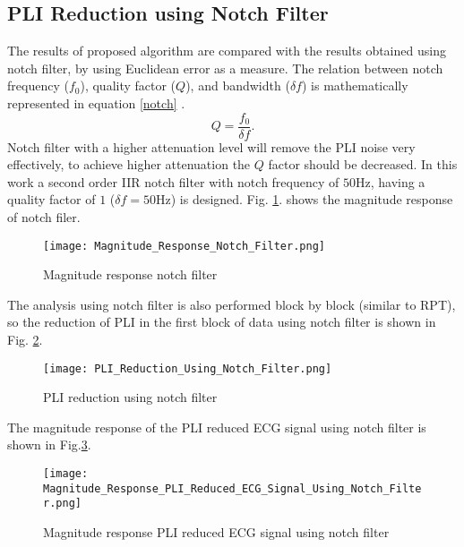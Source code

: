 \documentclass[conference]{IEEEtran}
\begin{document}

\subsection{PLI Reduction using Notch Filter}
The results of proposed algorithm are compared with the results obtained using notch filter, by using Euclidean error as a measure. The relation between notch frequency ($f_0$), quality factor ($Q$), and bandwidth ($\delta{f}$) is mathematically represented in equation \eqref{notch} \cite{6530021}.
\begin{equation}
\label{notch}
Q = \frac{f_0}{\delta{f}}.
\end{equation}
Notch filter with a higher attenuation level will remove the PLI noise very effectively, to achieve higher attenuation the $Q$ factor should be decreased. In this work a second order IIR notch filter with notch frequency of $50$Hz, having a quality factor of $1$ ($\delta{f} = 50$Hz) is designed. Fig. \ref{Magnitude Response Notch Filter}. shows the magnitude response of notch filer.
\begin{figure}[!h]
\centering
 \texttt{[image: Magnitude\_Response\_Notch\_Filter.png]} 
\caption[Magnitude Response Notch Filter]{Magnitude response notch filter}
\label{Magnitude Response Notch Filter}
\end{figure}

The analysis using notch filter is also performed block by block (similar to RPT), so the reduction of PLI in the first block of data using notch filter is shown in Fig. \ref{PLI Reduction Using Notch Filter}.
\begin{figure}[!h]
\centering
 \texttt{[image: PLI\_Reduction\_Using\_Notch\_Filter.png]} 
\caption[PLI Reduction Using Notch Filter]{PLI reduction using notch filter}
\label{PLI Reduction Using Notch Filter}
\end{figure}
The magnitude response of the PLI reduced ECG signal using notch filter is shown in Fig.\ref{Magnitude Response PLI Reduced ECG Signal Using Notch Filter}.
\begin{figure}[!h]
\centering
 \texttt{[image: Magnitude\_Response\_PLI\_Reduced\_ECG\_Signal\_Using\_Notch\_Filter.png]} 
\caption[Magnitude Response PLI Reduced ECG Signal Using Notch Filter]{Magnitude response PLI reduced ECG signal using notch filter}
\label{Magnitude Response PLI Reduced ECG Signal Using Notch Filter}
\end{figure}
\end{document}
